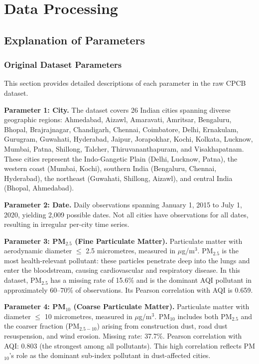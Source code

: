 \documentclass[12pt,a4paper]{report}
\begin{document}
\clearpage
\chapter{Data Processing}\label{idx:ch5}

\section{Explanation of Parameters}\label{idx:s51}

\subsection{Original Dataset Parameters}

This section provides detailed descriptions of each parameter in the raw CPCB dataset.

\textbf{Parameter 1: City.} The dataset covers 26 Indian cities spanning diverse geographic regions: Ahmedabad, Aizawl, Amaravati, Amritsar, Bengaluru, Bhopal, Brajrajnagar, Chandigarh, Chennai, Coimbatore, Delhi, Ernakulam, Gurugram, Guwahati, Hyderabad, Jaipur, Jorapokhar, Kochi, Kolkata, Lucknow, Mumbai, Patna, Shillong, Talcher, Thiruvananthapuram, and Visakhapatnam. These cities represent the Indo-Gangetic Plain (Delhi, Lucknow, Patna), the western coast (Mumbai, Kochi), southern India (Bengaluru, Chennai, Hyderabad), the northeast (Guwahati, Shillong, Aizawl), and central India (Bhopal, Ahmedabad).

\textbf{Parameter 2: Date.} Daily observations spanning January 1, 2015 to July 1, 2020, yielding 2,009 possible dates. Not all cities have observations for all dates, resulting in irregular per-city time series.

\textbf{Parameter 3: PM$_{2.5}$ (Fine Particulate Matter).} Particulate matter with aerodynamic diameter $\leq$ 2.5 micrometres, measured in $\mu$g/m$^3$. PM$_{2.5}$ is the most health-relevant pollutant: these particles penetrate deep into the lungs and enter the bloodstream, causing cardiovascular and respiratory disease. In this dataset, PM$_{2.5}$ has a missing rate of 15.6\% and is the dominant AQI pollutant in approximately 60--70\% of observations. Its Pearson correlation with AQI is 0.659.

\textbf{Parameter 4: PM$_{10}$ (Coarse Particulate Matter).} Particulate matter with diameter $\leq$ 10 micrometres, measured in $\mu$g/m$^3$. PM$_{10}$ includes both PM$_{2.5}$ and the coarser fraction (PM$_{2.5-10}$) arising from construction dust, road dust resuspension, and wind erosion. Missing rate: 37.7\%. Pearson correlation with AQI: 0.803 (the strongest among all pollutants). This high correlation reflects PM$_{10}$'s role as the dominant sub-index pollutant in dust-affected cities.
\end{document}
